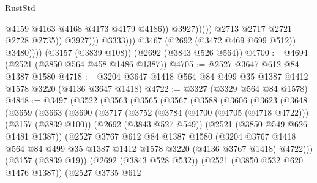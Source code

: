 \begin{lexlean}{RustStd}
\begin{coremodule}
{\begin{coremodule}
{{{{{{{{{{                                          @4159
                                          @4163
                                          @4168
                                          @4173
                                          @4179
                                          @4186))
                                      @3927)))))
                            @2713
                            @2717
                            @2721
                            @2728
                            @2735))
                        @3927)))
                  @3333)))
            @3467
            (@2692 (@3472 @469 @699 @512))
            @3480))))
    (@3157 (@3839 @108))
    (@2692 (@3843 @526 @564))
@4700 := @4694 (@2521 (@3850 @564 @458 @1486 @1387))
@4705 := @2527 @3647 @612 @84 @1387 @1580
@4718 := @3204 @3647 @1418 @564 @84 @499 @35 @1387 @1412 @1578 @3220 (@4136 @3647 @1418)
@4722 := @3327 (@3329 @564 @84 @1578)
@4848 := @3497
    (@3522
      (@3563
        (@3565
          (@3567
            (@3588
              (@3606
                (@3623
                  (@3648
                    (@3659
                      (@3663
                        (@3690
                          (@3717
                            (@3752
                              (@3784
                                (@4700 (@4705 (@4718 @4722)))
                                (@3157 (@3839 @100))
                                (@2692 (@3843 @527 @549))
                                (@2521 (@3850 @549 @626 @1481 @1387))
                                (@2527
                                  @3767
                                  @612
                                  @84
                                  @1387
                                  @1580
                                  (@3204
                                    @3767
                                    @1418
                                    @564
                                    @84
                                    @499
                                    @35
                                    @1387
                                    @1412
                                    @1578
                                    @3220
                                    (@4136 @3767 @1418)
                                    @4722)))
                              (@3157 (@3839 @19))
                              (@2692 (@3843 @528 @532))
                              (@2521 (@3850 @532 @620 @1476 @1387))
                              (@2527
                                @3735
                                @612
}}}}}}}}}}
\end{coremodule}}
\end{coremodule}
\end{lexlean}
